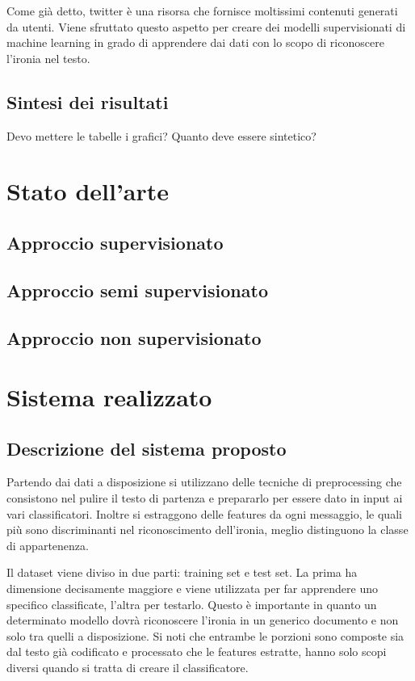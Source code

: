 \documentclass[oneside]{book}
\begin{document}
Come già detto, twitter è una risorsa che fornisce moltissimi contenuti generati da utenti. Viene sfruttato questo aspetto per creare dei modelli supervisionati di machine learning in grado di apprendere dai dati con lo scopo di riconoscere l'ironia nel testo.



\section*{Sintesi dei risultati}
Devo mettere le tabelle i grafici? Quanto deve essere sintetico?


\chapter{Stato dell'arte}

\section{Approccio supervisionato}

\section{Approccio semi supervisionato}

\section{Approccio non supervisionato}


\chapter{Sistema realizzato}

\section{Descrizione del sistema proposto}
Partendo dai dati a disposizione si utilizzano delle tecniche di preprocessing che consistono nel pulire il testo di partenza e prepararlo per essere dato in input ai vari classificatori. Inoltre si estraggono delle features da ogni messaggio, le quali più sono discriminanti nel riconoscimento dell'ironia, meglio distinguono la classe di appartenenza.

Il dataset viene diviso in due parti: training set e test set. La prima ha dimensione decisamente maggiore e viene utilizzata per far apprendere uno specifico classificate, l'altra per testarlo. Questo è importante in quanto un determinato modello dovrà riconoscere l'ironia in un generico documento e non solo tra quelli a disposizione. Si noti che entrambe le porzioni sono composte sia dal testo già codificato e processato che le features estratte, hanno solo scopi diversi quando si tratta di creare il classificatore. 
\end{document}
